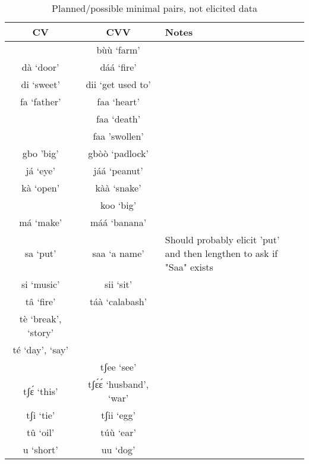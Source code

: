\documentclass{assets/fieldnotes}
\begin{document}
\begin{table}[h!tbp]
    \centering
    \begin{tabular}{c|c|l}
    \hline
    \textbf{CV}	& \textbf{CVV}	& \textbf{Notes} \\
    \hline
    & bùù `farm' & \\
    \hline
    dà `door' & dáá `fire'	& \\
    \hline
    di `sweet' &	dii `get used to' & \\
    \hline
    fa `father' & faa `heart' & \\	
    \hline
    &faa `death'& \\
    \hline
    & faa 'swollen' & \\
    \hline
    gbo 'big' & gbòò `padlock'&\\
    \hline
    já `eye'& jáá `peanut'&\\	
    \hline
    kà `open' & kàà `snake'&\\
    \hline
    & koo `big'&\\	
    \hline
    má `make' & máá `banana'&\\
    \hline
    sa `put' & saa `a name' & \makecell{Should probably elicit 'put'\\and then lengthen to ask if "Saa" exists}\\
    \hline
    si `music' & sii `sit' & \\	
    \hline
    tâ `fire' & táà `calabash'&\\	
    \hline
    tè `break', `story' & &\\
    \hline
    té `day', `say' & &\\
    \hline
    &tʃee `see' & \\
    \hline
    tʃɛ́ `this' & tʃɛ́ɛ́ `husband', `war' &\\	
    \hline
    tʃi `tie' & tʃii `egg' &\\	
    \hline
    tû `oil' & túù `ear' &\\
    \hline
    u `short' & uu `dog' &\\
    \hline
    \end{tabular}
    \caption{Planned/possible minimal pairs, not elicited data}
    \label{tab:my_label}
\end{table}
\end{document}
